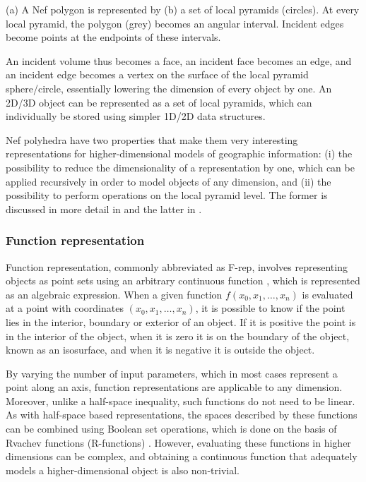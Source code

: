 {\caption[A Nef polygon represented by a set of local pyramids]{(a) A Nef polygon is represented by (b) a set of local pyramids (circles). At every local pyramid, the polygon (grey) becomes an angular interval. Incident edges become points at the endpoints of these intervals.}
\label{fig:nef}
}
An incident volume thus becomes a face, an incident face becomes an edge, and an incident edge becomes a vertex on the surface of the local pyramid sphere/circle, essentially lowering the dimension of every object by one.
An 2D/3D object can be represented as a set of local pyramids, which can individually be stored using simpler 1D/2D data structures.

Nef polyhedra have two properties that make them very interesting representations for higher-dimensional models of geographic information: (i) the possibility to reduce the dimensionality of a representation by one, which can be applied recursively in order to model objects of any dimension, and (ii) the possibility to perform operations on the local pyramid level.
The former is discussed in more detail in  and the latter in .

\subsubsection{Function representation}

Function representation, commonly abbreviated as F-rep, involves representing objects as point sets using an arbitrary continuous function \citep{Pasko95}, which is represented as an algebraic expression.
When a given function $f(x_0, x_1, \ldots, x_n)$ is evaluated at a point with coordinates $(x_0, x_1, \ldots, x_n)$, it is possible to know if the point lies in the interior, boundary or exterior of an object.
If it is positive the point is in the interior of the object, when it is zero it is on the boundary of the object, known as an isosurface, and when it is negative it is outside the object.

By varying the number of input parameters, which in most cases represent a point along an axis, function representations are applicable to any dimension.
Moreover, unlike a half-space inequality, such functions do not need to be linear.
As with half-space based representations, the spaces described by these functions can be combined using Boolean set operations, which is done on the basis of Rvachev functions (R-functions) \citep{Rvachev63}.
However, evaluating these functions in higher dimensions can be complex, and obtaining a continuous function that adequately models a higher-dimensional object is also non-trivial.

